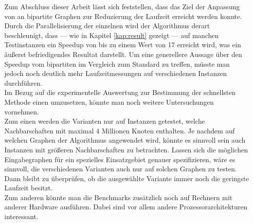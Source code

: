 



Zum Abschluss dieser Arbeit lässt sich feststellen, dass das Ziel 
der Anpassung von \gc{} an bipartite Graphen zur Reduzierung der Laufzeit erreicht werden konnte.
Durch die Parallelisierung der einzelnen  wird der Algorithmus derart beschleunigt, dass --- wie
in Kapitel \ref{kap:result} gezeigt --- auf manchen Testinstanzen ein
Speedup von bis zu einem Wert von 17 erreicht wird, was ein äußerst befriedigendes Resultat darstellt. 
Um eine generellere Aussage über den Speedup vom bipartiten \gc{} im Vergleich zum Standard  \gc{}
zu treffen, müsste man jedoch noch deutlich mehr Laufzeitmessungen auf verschiedenen Instanzen
durchführen.
\\

Im Bezug auf die experimentelle Auswertung zur Bestimmung der schnellsten Methode 
einen \ct{} umzusetzen, könnte man noch weitere Untersuchungen vornehmen.
\\

Zum einen werden die Varianten nur auf Instanzen getestet, welche Nachbarschaften mit 
maximal 4 Millionen Knoten enthalten. Je nachdem auf welchen Graphen der Algorithmus angewendet wird, 
könnte es sinnvoll sein auch Instanzen
mit größeren Nachbarschaften zu betrachten. Lassen sich die möglichen Eingabegraphen
für ein spezielles Einsatzgebiet genauer spezifizieren, wäre es sinnvoll, die verschiedenen
Varianten auch nur auf solchen Graphen zu testen. Dann bleibt zu überprüfen, ob die ausgewählte
Variante immer noch die geringste Laufzeit besitzt.
\\

Zum anderen könnte man die Benchmarks zusätzlich noch auf Rechnern mit anderer Hardware ausführen.
Dabei sind vor allem andere Prozessorarchitekturen interessant.
